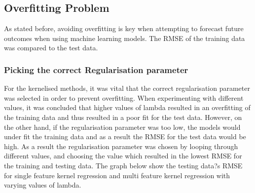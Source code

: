 \documentclass[a4paper,11pt,twoside]{article}
\begin{document}
\subsection{Overfitting Problem}
As stated before, avoiding overfitting is key when attempting to forecast future outcomes when using machine learning models. The RMSE of the training data was compared to the test data.


\begin{table}[h!]
\captionsetup{justification=centering}
\begin{center}
\end{center}
\caption{Comparing the RMSE of the training data and the testing data for every model}
\end{table}
\vspace{5mm}

\subsubsection{Picking the correct Regularisation parameter}

For the kernelised methods, it was vital that the correct regularisation parameter was selected in order to prevent overfitting. When experimenting with different values, it was concluded that higher values of lambda resulted in an overfitting of the training data and thus resulted in a poor fit for the test data. However, on the other hand, if the regularisation parameter was too low, the models would under fit the training data and as a result the RMSE for the test data would be high. As a result the regularisation parameter was chosen by looping through different values, and choosing the value which resulted in the lowest RMSE for the training and testing data. The graph below show the testing data?s RMSE for single feature kernel regression and multi feature kernel regression with varying values of lambda. 
\end{document}
